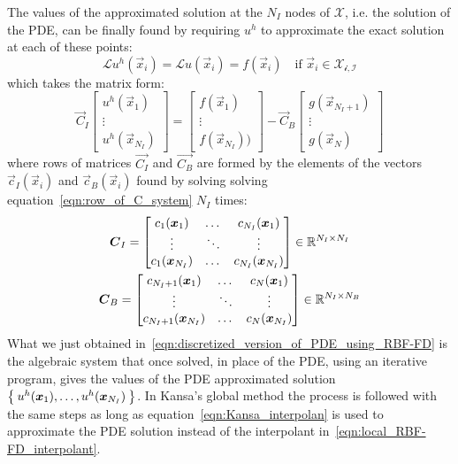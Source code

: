 \medskip
The values of the approximated solution at the $N_I$ nodes of $\mathcal{X}$, i.e. the solution of the PDE, can be finally found by requiring $u^h$ to approximate the exact solution at each of these points:
\begin{equation}
	\mathcal{L}u^h(\vec{x}_i) = \mathcal{L}u(\vec{x}_i) = f(\vec{x}_i)  \quad  \text{if $\vec{x}_i \in \mathcal{X_{i,I}}$}
\end{equation}
which takes the matrix form:
\begin{equation}
\label{eqn:discretized_version_of_PDE_using_RBF-FD}
\vec{C}_I
\begin{bmatrix}
	u^h(\vec{x}_1)  \\
	\vdots			\\
	u^h(\vec{x}_{N_I})
\end{bmatrix}
=
\begin{bmatrix}
	f(\vec{x}_1)  \\
	\vdots		  \\
	f(\vec{x}_{N_I}))
\end{bmatrix}
-
\vec{C}_B
\begin{bmatrix}
	g(\vec{x}_{N_I+1})  \\
	\vdots				\\
	g(\vec{x}_{N})
\end{bmatrix}
\end{equation}
where rows of matrices $\vec{C_I}$ and $\vec{C_B}$ are formed by the elements of the vectors $\vec{c}_I(\vec{x}_i)$ and $\vec{c}_B(\vec{x}_i)$ found by solving solving equation~\eqref{eqn:row_of_C_system} $N_I$ times:
\begin{equation}
	\begin{gathered}
		\boldsymbol{C}_I = \begin{bmatrix}
						c_1{(\boldsymbol{x}_1)}  	&  \dots  & c_{N_I}(\boldsymbol{x}_1)  	\\
						\vdots				& \ddots  & \vdots					\\
						c_1{(\boldsymbol{x}_{N_I})}  &  \dots  & c_{N_I}(\boldsymbol{x}_{N_I})
					\end{bmatrix} \in \mathbb{R}^{N_I \times N_I}  \\
		\boldsymbol{C}_B = \begin{bmatrix}
						c_{N_I+1}{(\boldsymbol{x}_1)}  	  &  \dots  & c_{N}(\boldsymbol{x}_1)  	\\
						\vdots					  & \ddots  & \vdots				\\
						c_{N_I+1}{(\boldsymbol{x}_{N_I})}  &  \dots  & c_{N}(\boldsymbol{x}_{N_I})
					\end{bmatrix} \in \mathbb{R}^{N_I \times N_B}
	\end{gathered}
\end{equation}
What we just obtained in~\eqref{eqn:discretized_version_of_PDE_using_RBF-FD} is the algebraic system that once solved, in place of the PDE, using an iterative program, gives the values of the PDE approximated solution $\Set{u^h(\boldsymbol{x}_1), \dots, u^h(\boldsymbol{x}_{N_I})}$. In Kansa's global method the process is followed with the same steps as long as equation~\eqref{eqn:Kansa_interpolan} is used to approximate the PDE solution instead of the interpolant in~\eqref{eqn:local_RBF-FD_interpolant}.

